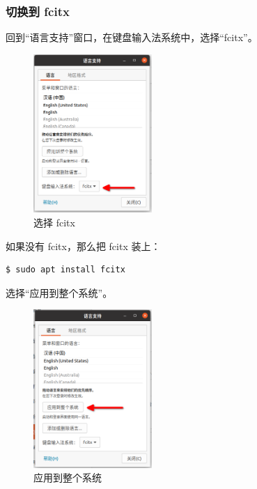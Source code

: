 \documentclass[UTF-8]{ctexart}
\begin{document}
			\subsubsection{切换到 fcitx}
	
				回到“语言支持”窗口，在键盘输入法系统中，选择“fcitx”。
				
				\begin{figure}[H]
					\centering
					\includegraphics[width=0.4\textwidth]{fig/choose_fcitx.png}
					\caption*{选择 fcitx}
				\end{figure}
				
				如果没有 fcitx，那么把 fcitx 装上：
				
				\begin{verbatim}
$ sudo apt install fcitx
				\end{verbatim}
			
				选择“应用到整个系统”。
				
				\begin{figure}[H]
					\centering
					\includegraphics[width=0.4\textwidth]{fig/apply_langs_settings.png}
					\caption*{应用到整个系统}
				\end{figure}
			
\end{document}
